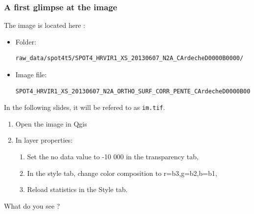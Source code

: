 \documentclass[8pt]{beamer}
\begin{document}
\begin{frame}[fragile]

\frametitle{A first glimpse at the image}

The image is located here :

\begin{itemize}
\item Folder: \begin{scriptsize}\begin{verbatim}raw_data/spot4t5/SPOT4_HRVIR1_XS_20130607_N2A_CArdecheD0000B0000/\end{verbatim}\end{scriptsize}
\item Image file: \begin{scriptsize}\begin{verbatim}SPOT4_HRVIR1_XS_20130607_N2A_ORTHO_SURF_CORR_PENTE_CArdecheD0000B0000.TIF\end{verbatim}\end{scriptsize}
\end{itemize}

In the following slides, it will be refered to as \texttt{im.tif}.

\begin{enumerate}
\item Open the image in Qgis
\item In layer properties:
  \begin{enumerate}
    \item Set the no data value to -10 000 in the transparency tab,
    \item In the style tab, change color composition to r=b3,g=b2,b=b1,
    \item Reload statistics in the Style tab.
  \end{enumerate}
\end{enumerate}
What do you see ?
\end{frame}
\end{document}
